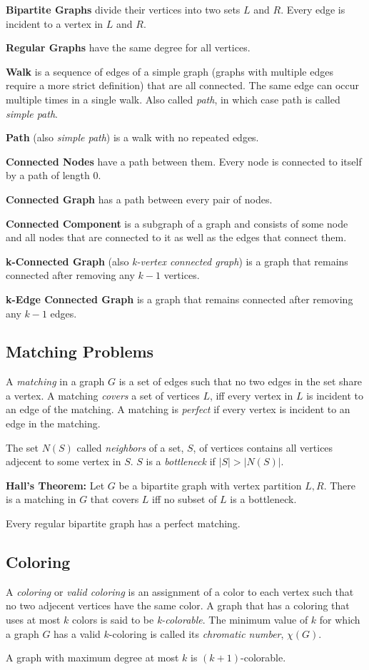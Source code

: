 \documentclass[../main.tex]{subfiles}
\begin{document}
\textbf{Bipartite Graphs} divide their vertices into two sets $L$ and $R$. Every edge is incident to a vertex in $L$ and $R$.

\textbf{Regular Graphs} have the same degree for all vertices.

\textbf{Walk} is a sequence of edges of a simple graph (graphs with multiple edges require a more strict definition) that are all connected. The same edge can occur multiple times in a single walk. Also called \textit{path}, in which case path is called \textit{simple path}.

\textbf{Path} (also \textit{simple path}) is a walk with no repeated edges.

\textbf{Connected Nodes} have a path between them. Every node is connected to itself by a path of length $0$.

\textbf{Connected Graph} has a path between every pair of nodes.

\textbf{Connected Component} is a subgraph of a graph and consists of some node and all nodes that are connected to it as well as the edges that connect them.

\textbf{k-Connected Graph} (also \textit{k-vertex connected graph}) is a graph that remains connected after removing any $k-1$ vertices.

\textbf{k-Edge Connected Graph} is a graph that remains connected after removing any $k-1$ edges.

\subsection{Matching Problems}

A \textit{matching} in a graph $G$ is a set of edges such that no two edges in the set share a vertex. A matching \textit{covers} a set of vertices $L$, iff every vertex in $L$ is incident to an edge of the matching. A matching is \textit{perfect} if every vertex is incident to an edge in the matching.

The set $N(S)$ called \textit{neighbors} of a set, $S$, of vertices contains all vertices adjecent to some vertex in $S$. $S$ is a \textit{bottleneck} if $|S| > |N(S)|$.

\textbf{Hall's Theorem:}
Let $G$ be a bipartite graph with vertex partition $L, R$. There is a matching in $G$ that covers $L$ iff no subset of $L$ is a bottleneck.

Every regular bipartite graph has a perfect matching.

\subsection{Coloring}

A \textit{coloring} or \textit{valid coloring} is an assignment of a color to each vertex such that no two adjecent vertices have the same color. A graph that has a coloring that uses at most $k$ colors is said to be \textit{k-colorable}. The minimum value of $k$ for which a graph $G$ has a valid $k$-coloring is called its \textit{chromatic number}, $\chi(G)$.

A graph with maximum degree at most $k$ is $(k+1)$-colorable. 
\end{document}
